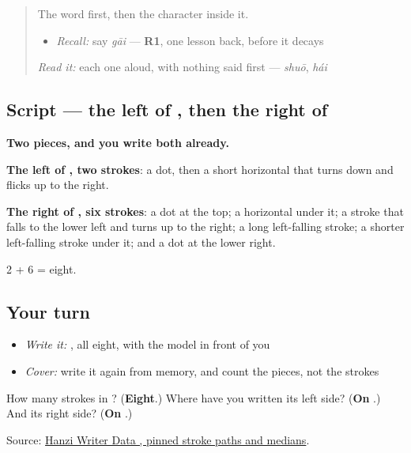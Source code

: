 \label{lesson:ZH-W282-gai}



\begin{quote}
The word first, then the character inside it.

\begin{itemize}
\raggedright
  \item \emph{Recall:} say \emph{gāi} — \textbf{R1}, one lesson back, before it decays
\end{itemize}

\begin{quote}
 
\end{quote}

\emph{Read it:} each one aloud, with nothing said first — \emph{shuō}, \emph{hái}
\end{quote}

\subsection*{Script — the left of , then the right of }

\begin{quote}
\end{quote}

\textbf{Two pieces, and you write both already.}

\textbf{The left of , two strokes}: a dot, then a short horizontal that turns down and flicks up to the right.

\textbf{The right of , six strokes}: a dot at the top; a horizontal under it; a stroke that falls to the lower left and turns up to the right; a long left-falling stroke; a shorter left-falling stroke under it; and a dot at the lower right.

2 + 6 = eight.

\subsection*{Your turn}
\begin{itemize}
\raggedright
  \item \emph{Write it:} , all eight, with the model in front of you
  \item \emph{Cover:} write it again from memory, and count the pieces, not the strokes
\end{itemize}

\begin{tcolorbox}[breakable,colback=teal!4,colframe=teal!35!black,title={Before you move on}]
How many strokes in ? (\textbf{Eight}.) Where have you written its left side? (\textbf{On }.) And its right side? (\textbf{On }.)

Source: \href{https://raw.githubusercontent.com/chanind/hanzi-writer-data/68d10a4b21150cae5e1ebbd223eed289cf32d90c/data/\%E8\%AF\%A5.json}{Hanzi Writer Data , pinned stroke paths and medians}.
\end{tcolorbox}
